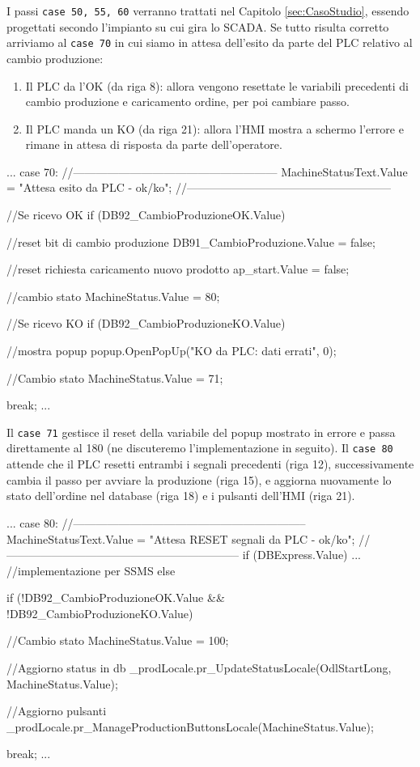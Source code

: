 I passi \verb|case 50, 55, 60| verranno trattati nel Capitolo \ref{sec:CasoStudio}, essendo progettati secondo l'impianto su cui gira lo SCADA. Se tutto risulta corretto arriviamo al \verb|case 70| in cui siamo in attesa dell'esito da parte del PLC relativo al cambio produzione:
\begin{enumerate}
    \item Il PLC da l'OK (da riga 8): allora vengono resettate le variabili precedenti di cambio produzione e caricamento ordine, per poi cambiare passo.
    \item Il PLC manda un KO (da riga 21): allora l'HMI mostra a schermo l'errore e rimane in attesa di risposta da parte dell'operatore.
\end{enumerate}
\begin{csharp}
...
    case 70:
    //------------------------------------------------------
    MachineStatusText.Value = "Attesa esito da PLC - ok/ko";
    //------------------------------------------------------

    //Se ricevo OK
    if (DB92_CambioProduzioneOK.Value)
    {
        //reset bit di cambio produzione
        DB91_CambioProduzione.Value = false;

        //reset richiesta caricamento nuovo prodotto
        ap_start.Value = false;

        //cambio stato
        MachineStatus.Value = 80;
    }

    //Se ricevo KO
    if (DB92_CambioProduzioneKO.Value)
    {
        //mostra popup
        popup.OpenPopUp("KO da PLC: dati errati", 0);

        //Cambio stato
        MachineStatus.Value = 71;
    }

    break;
...
\end{csharp}
Il \verb|case 71| gestisce il reset della variabile del popup mostrato in errore e passa direttamente al 180 (ne discuteremo l'implementazione in seguito). Il \verb|case 80| attende che il PLC resetti entrambi i segnali precedenti (riga 12), successivamente cambia il passo per avviare la produzione (riga 15), e aggiorna nuovamente lo stato dell'ordine nel database (riga 18) e i pulsanti dell'HMI (riga 21).
\begin{csharp}
...
    case 80:
    //--------------------------------------------------------------
    MachineStatusText.Value = "Attesa RESET segnali da PLC - ok/ko";
    //--------------------------------------------------------------
    if (DBExpress.Value)
    {
        ... //implementazione per SSMS
    }
    else
    {
        if (!DB92_CambioProduzioneOK.Value && !DB92_CambioProduzioneKO.Value)
        {
            //Cambio stato
            MachineStatus.Value = 100;

            //Aggiorno status in db
            _prodLocale.pr_UpdateStatusLocale(OdlStartLong, MachineStatus.Value);

            //Aggiorno pulsanti
            _prodLocale.pr_ManageProductionButtonsLocale(MachineStatus.Value);
        }
    }
    
    break;
...
\end{csharp}
